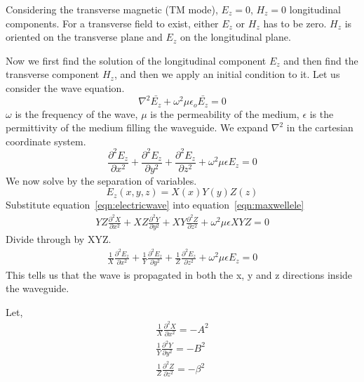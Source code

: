 Considering the transverse magnetic (TM mode), $ E_{z} = 0$, $H_{z} = 0 $ longitudinal components. For a transverse field to exist, either $ E_{z} $ or $ H_{z} $ has to be zero. $ H_{z} $ is oriented on the transverse plane and $ E_{z} $ on the longitudinal plane.

Now we first find the solution of the longitudinal component $ E_{z} $ and then find the transverse component $ H_{z} $, and then we apply an initial condition to it. Let us consider the wave equation.
\begin{equation}
\nabla^{2}\bar{E_{z}} + \omega^{2}\mu\epsilon_{o}\bar{E_{z}} = 0
\end{equation}
$ \omega $  is the frequency of the wave, $ \mu $   is the permeability of the medium, $ \epsilon $ is the permittivity of the medium filling the waveguide. We expand $ \nabla^{2} $ in the cartesian coordinate system.
\begin{equation}
\frac{\partial ^{2} E_z}{\partial x^2} + \frac{\partial ^2 E_z}{\partial y^2} + \frac{\partial ^2 E_z}{\partial z^2}+ \omega^2\mu\epsilon {E_{z}} = 0
\label{eqn:maxwellele}
\end{equation}
We now solve by the separation of variables.
\begin{equation}
E_z (x,y,z) = X(x)Y(y)Z(z)
\label{eqn:electricwave}
\end{equation}
Substitute equation~\ref{eqn:electricwave} into equation~\ref{eqn:maxwellele}
\begin{align}
YZ \frac{\partial ^{2} X}{\partial x^2} + XZ \frac{\partial ^2 Y}{\partial y^2} + XY \frac{\partial ^2 Z}{\partial z^2}+ \omega^2\mu\epsilon {XYZ} = 0
\end{align}
Divide through by XYZ.
\begin{align}
\frac{1}{X}\frac{\partial ^{2} E_z}{\partial x^2} + \frac{1}{Y}\frac{\partial ^2 E_z}{\partial y^2} + \frac{1}{Z} \frac{\partial ^2 E_z}{\partial z^2} + \omega^2\mu\epsilon {E_{z}} = 0
\end{align}
This tells us that the wave is propagated in both the x, y and z directions inside the waveguide. 

Let,  
\begin{align*}
\frac{1}{X}\frac{\partial^2 X}{\partial x^2} = -A^2\\
\frac{1}{Y}\frac{\partial^2 Y}{\partial y^2} = -B^2\\
\frac{1}{Z}\frac{\partial^2 Z}{\partial z^2} = -\beta^2
\end{align*}


